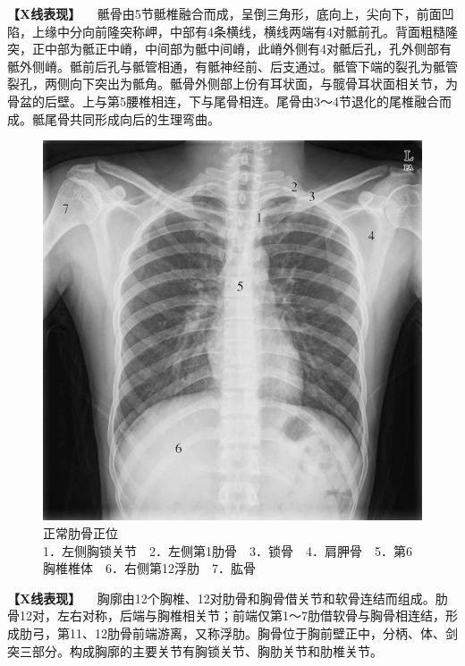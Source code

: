 \textbf{【X线表现】}
　骶骨由5节骶椎融合而成，呈倒三角形，底向上，尖向下，前面凹陷，上缘中分向前隆突称岬，中部有4条横线，横线两端有4对骶前孔。背面粗糙隆突，正中部为骶正中嵴，中间部为骶中间嵴，此嵴外侧有4对骶后孔，孔外侧部有骶外侧嵴。骶前后孔与骶管相通，有骶神经前、后支通过。骶管下端的裂孔为骶管裂孔，两侧向下突出为骶角。骶骨外侧部上份有耳状面，与髋骨耳状面相关节，为骨盆的后壁。上与第5腰椎相连，下与尾骨相连。尾骨由3～4节退化的尾椎融合而成。骶尾骨共同形成向后的生理弯曲。

\begin{figure}[!htbp]
 \centering
 \includegraphics{./images/Image00015.jpg}
 \captionsetup{justification=centering}
 \caption{正常肋骨正位\\{\small 1．左侧胸锁关节　2．左侧第1肋骨　3．锁骨　4．肩胛骨　5．第6胸椎椎体　6．右侧第12浮肋　7．肱骨}}
 \label{fig2-1-13}
  \end{figure} 

\textbf{【X线表现】}
　胸廓由12个胸椎、12对肋骨和胸骨借关节和软骨连结而组成。肋骨12对，左右对称，后端与胸椎相关节；前端仅第1～7肋借软骨与胸骨相连结，形成肋弓，第11、12肋骨前端游离，又称浮肋。胸骨位于胸前壁正中，分柄、体、剑突三部分。构成胸廓的主要关节有胸锁关节、胸肋关节和肋椎关节。

